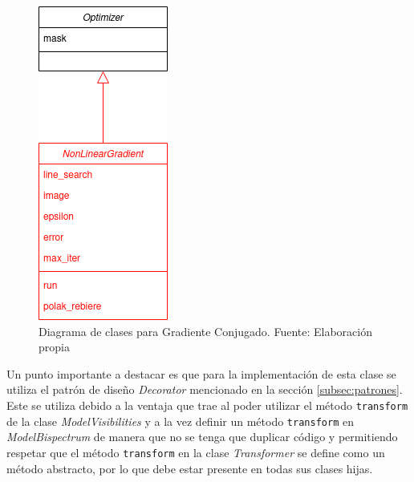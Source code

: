 \begin{figure}[!ht]
	\centering
	\captionsetup{justification=centering}
	\includegraphics[scale=0.4]{images/Gradient.png}
	\caption[Diagrama de clases para Gradiente Conjugado]{Diagrama de clases para Gradiente Conjugado. Fuente: Elaboración propia}
	\label{fig:pyralysis_gradient}
\end{figure}

Un punto importante a destacar es que para la implementación de esta clase se utiliza el patrón de diseño \textit{Decorator} mencionado en la sección \ref{subsec:patrones}. Este se utiliza debido a la ventaja que trae al poder utilizar el método \texttt{transform} de la clase \textit{ModelVisibilities} y a la vez definir un método \texttt{transform} en \textit{ModelBispectrum} de manera que no se tenga que duplicar código y permitiendo respetar que el método \texttt{transform} en la clase \textit{Transformer} se define como un método abstracto, por lo que debe estar presente en todas sus clases hijas. 

